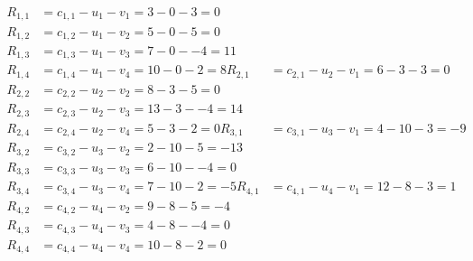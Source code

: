 \[
\begin{aligned}
R_{1,1} &= c_{1,1} - u_{1} - v_{1} = 3 - 0 - 3 = 0 \\
R_{1,2} &= c_{1,2} - u_{1} - v_{2} = 5 - 0 - 5 = 0 \\
R_{1,3} &= c_{1,3} - u_{1} - v_{3} = 7 - 0 - -4 = 11 \\
R_{1,4} &= c_{1,4} - u_{1} - v_{4} = 10 - 0 - 2 = 8 
R_{2,1} &= c_{2,1} - u_{2} - v_{1} = 6 - 3 - 3 = 0 \\
R_{2,2} &= c_{2,2} - u_{2} - v_{2} = 8 - 3 - 5 = 0 \\
R_{2,3} &= c_{2,3} - u_{2} - v_{3} = 13 - 3 - -4 = 14 \\
R_{2,4} &= c_{2,4} - u_{2} - v_{4} = 5 - 3 - 2 = 0 
R_{3,1} &= c_{3,1} - u_{3} - v_{1} = 4 - 10 - 3 = -9 \\
R_{3,2} &= c_{3,2} - u_{3} - v_{2} = 2 - 10 - 5 = -13 \\
R_{3,3} &= c_{3,3} - u_{3} - v_{3} = 6 - 10 - -4 = 0 \\
R_{3,4} &= c_{3,4} - u_{3} - v_{4} = 7 - 10 - 2 = -5 
R_{4,1} &= c_{4,1} - u_{4} - v_{1} = 12 - 8 - 3 = 1 \\
R_{4,2} &= c_{4,2} - u_{4} - v_{2} = 9 - 8 - 5 = -4 \\
R_{4,3} &= c_{4,3} - u_{4} - v_{3} = 4 - 8 - -4 = 0 \\
R_{4,4} &= c_{4,4} - u_{4} - v_{4} = 10 - 8 - 2 = 0 
\end{aligned}
\]

